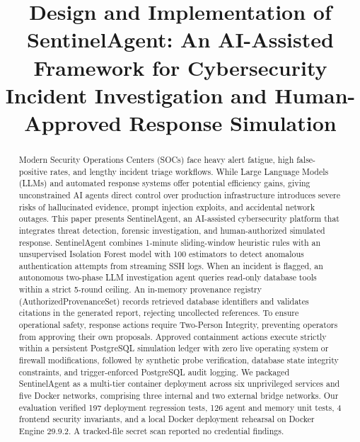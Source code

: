 \documentclass[conference]{IEEEtran}
\begin{document}
\title{Design and Implementation of SentinelAgent: An AI-Assisted Framework for Cybersecurity Incident Investigation and Human-Approved Response Simulation}

\author{
}

\maketitle

\begin{abstract}
Modern Security Operations Centers (SOCs) face heavy alert fatigue, high false-positive rates, and lengthy incident triage workflows. While Large Language Models (LLMs) and automated response systems offer potential efficiency gains, giving unconstrained AI agents direct control over production infrastructure introduces severe risks of hallucinated evidence, prompt injection exploits, and accidental network outages. This paper presents SentinelAgent, an AI-assisted cybersecurity platform that integrates threat detection, forensic investigation, and human-authorized simulated response. SentinelAgent combines 1-minute sliding-window heuristic rules with an unsupervised Isolation Forest model with 100 estimators to detect anomalous authentication attempts from streaming SSH logs. When an incident is flagged, an autonomous two-phase LLM investigation agent queries read-only database tools within a strict 5-round ceiling. An in-memory provenance registry (AuthorizedProvenanceSet) records retrieved database identifiers and validates citations in the generated report, rejecting uncollected references. To ensure operational safety, response actions require Two-Person Integrity, preventing operators from approving their own proposals. Approved containment actions execute strictly within a persistent PostgreSQL simulation ledger with zero live operating system or firewall modifications, followed by synthetic probe verification, database state integrity constraints, and trigger-enforced PostgreSQL audit logging. We packaged SentinelAgent as a multi-tier container deployment across six unprivileged services and five Docker networks, comprising three internal and two external bridge networks. Our evaluation verified 197 deployment regression tests, 126 agent and memory unit tests, 4 frontend security invariants, and a local Docker deployment rehearsal on Docker Engine 29.9.2. A tracked-file secret scan reported no credential findings.
\end{abstract}
\end{document}
